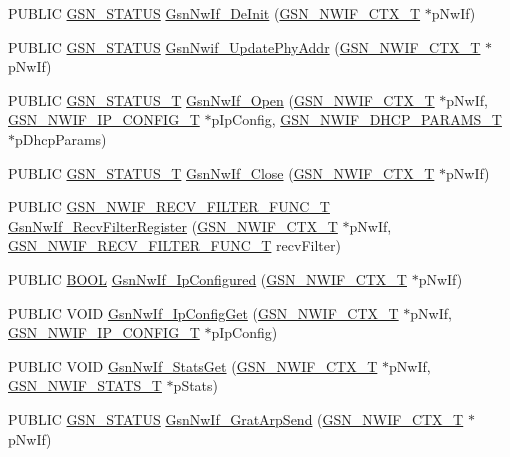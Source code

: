 \begin{DoxyCompactItemize}
\item 
PUBLIC \hyperlink{a00660_gada5951904ac6110b1fa95e51a9ddc217}{GSN\_\-STATUS} \hyperlink{a00534_a5f6202ffb14e7becc2f4a933765bee4b}{GsnNwIf\_\-DeInit} (\hyperlink{a00167}{GSN\_\-NWIF\_\-CTX\_\-T} $\ast$pNwIf)
\item 
PUBLIC \hyperlink{a00660_gada5951904ac6110b1fa95e51a9ddc217}{GSN\_\-STATUS} \hyperlink{a00534_ac34c16941b0c478421518bf4dda11aa7}{GsnNwif\_\-UpdatePhyAddr} (\hyperlink{a00167}{GSN\_\-NWIF\_\-CTX\_\-T} $\ast$pNwIf)
\item 
PUBLIC \hyperlink{a00659_gae36517c0f5872426a7034c9551eb96ac}{GSN\_\-STATUS\_\-T} \hyperlink{a00534_ac810c0ab5151ae273488de8679923e19}{GsnNwIf\_\-Open} (\hyperlink{a00167}{GSN\_\-NWIF\_\-CTX\_\-T} $\ast$pNwIf, \hyperlink{a00172}{GSN\_\-NWIF\_\-IP\_\-CONFIG\_\-T} $\ast$pIpConfig, \hyperlink{a00168}{GSN\_\-NWIF\_\-DHCP\_\-PARAMS\_\-T} $\ast$pDhcpParams)
\item 
PUBLIC \hyperlink{a00659_gae36517c0f5872426a7034c9551eb96ac}{GSN\_\-STATUS\_\-T} \hyperlink{a00534_a77bfff80b820cd026619abc81b3d9bd4}{GsnNwIf\_\-Close} (\hyperlink{a00167}{GSN\_\-NWIF\_\-CTX\_\-T} $\ast$pNwIf)
\item 
PUBLIC \hyperlink{a00534_a2ab3fab7c51c5e11d061387dd44a2381}{GSN\_\-NWIF\_\-RECV\_\-FILTER\_\-FUNC\_\-T} \hyperlink{a00534_a546e248cb0ba3d6fadb2dc408b44c3b8}{GsnNwIf\_\-RecvFilterRegister} (\hyperlink{a00167}{GSN\_\-NWIF\_\-CTX\_\-T} $\ast$pNwIf, \hyperlink{a00534_a2ab3fab7c51c5e11d061387dd44a2381}{GSN\_\-NWIF\_\-RECV\_\-FILTER\_\-FUNC\_\-T} recvFilter)
\item 
PUBLIC \hyperlink{a00660_ga1f04022c0a182c51c059438790ea138c}{BOOL} \hyperlink{a00534_aa7f12d0166f5446bb34584498d1baf7a}{GsnNwIf\_\-IpConfigured} (\hyperlink{a00167}{GSN\_\-NWIF\_\-CTX\_\-T} $\ast$pNwIf)
\item 
PUBLIC VOID \hyperlink{a00534_a117d1eca43c85e2a38d4156902c7b77a}{GsnNwIf\_\-IpConfigGet} (\hyperlink{a00167}{GSN\_\-NWIF\_\-CTX\_\-T} $\ast$pNwIf, \hyperlink{a00172}{GSN\_\-NWIF\_\-IP\_\-CONFIG\_\-T} $\ast$pIpConfig)
\item 
PUBLIC VOID \hyperlink{a00534_abc8558b7010c7c7edfc8caea64d11e66}{GsnNwIf\_\-StatsGet} (\hyperlink{a00167}{GSN\_\-NWIF\_\-CTX\_\-T} $\ast$pNwIf, \hyperlink{a00176}{GSN\_\-NWIF\_\-STATS\_\-T} $\ast$pStats)
\item 
PUBLIC \hyperlink{a00660_gada5951904ac6110b1fa95e51a9ddc217}{GSN\_\-STATUS} \hyperlink{a00534_a6586191869986cd46f76fe47d889be01}{GsnNwIf\_\-GratArpSend} (\hyperlink{a00167}{GSN\_\-NWIF\_\-CTX\_\-T} $\ast$pNwIf)
\item 

\end{DoxyCompactItemize}
